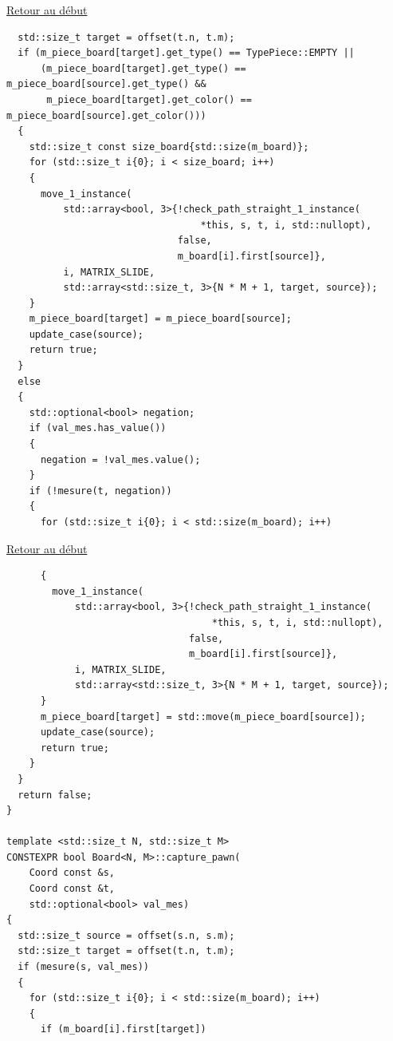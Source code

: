{\begin{frame}[fragile]
\hyperlink{conclusion}{Retour au début}\newline
\begin{verbatim}
  std::size_t target = offset(t.n, t.m);
  if (m_piece_board[target].get_type() == TypePiece::EMPTY ||
      (m_piece_board[target].get_type() == m_piece_board[source].get_type() &&
       m_piece_board[target].get_color() == m_piece_board[source].get_color()))
  {
    std::size_t const size_board{std::size(m_board)};
    for (std::size_t i{0}; i < size_board; i++)
    {
      move_1_instance(
          std::array<bool, 3>{!check_path_straight_1_instance(
                                  *this, s, t, i, std::nullopt),
                              false,
                              m_board[i].first[source]},
          i, MATRIX_SLIDE,
          std::array<std::size_t, 3>{N * M + 1, target, source});
    }
    m_piece_board[target] = m_piece_board[source];
    update_case(source);
    return true;
  }
  else
  {
    std::optional<bool> negation;
    if (val_mes.has_value())
    {
      negation = !val_mes.value();
    }
    if (!mesure(t, negation))
    {
      for (std::size_t i{0}; i < std::size(m_board); i++)
\end{verbatim}
\end{frame}

\begin{frame}[fragile]
\hyperlink{conclusion}{Retour au début}\newline
\begin{verbatim}
      {
        move_1_instance(
            std::array<bool, 3>{!check_path_straight_1_instance(
                                    *this, s, t, i, std::nullopt),
                                false,
                                m_board[i].first[source]},
            i, MATRIX_SLIDE,
            std::array<std::size_t, 3>{N * M + 1, target, source});
      }
      m_piece_board[target] = std::move(m_piece_board[source]);
      update_case(source);
      return true;
    }
  }
  return false;
}

template <std::size_t N, std::size_t M>
CONSTEXPR bool Board<N, M>::capture_pawn(
    Coord const &s,
    Coord const &t,
    std::optional<bool> val_mes)
{
  std::size_t source = offset(s.n, s.m);
  std::size_t target = offset(t.n, t.m);
  if (mesure(s, val_mes))
  {
    for (std::size_t i{0}; i < std::size(m_board); i++)
    {
      if (m_board[i].first[target])
\end{verbatim}
\end{frame}

}

